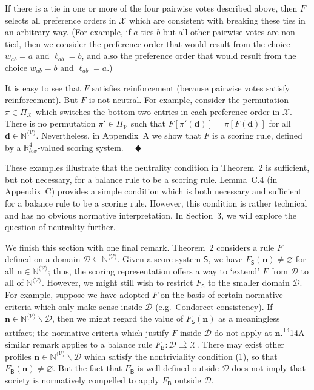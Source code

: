 \documentclass[
]{article}
\begin{document}
If there is a tie in one or more of the four pairwise votes described
above, then \(F\) selects all preference orders in \(\mathcal{X}\) which
are consistent with breaking these ties in an arbitrary way. (For
example, if \(a\) ties \(b\) but all other pairwise votes are non-tied,
then we consider the preference order that would result from the choice
\(w_{ab} = a\) and \(\ell_{ab} = b\), and also the preference order that
would result from the choice \(w_{ab} = b\) and \(\ell_{ab} = a\).)

It is easy to see that \(F\) satisfies reinforcement (because pairwise
votes satisfy reinforcement). But \(F\) is not neutral. For example,
consider the permutation \(\pi \in \Pi_{\mathcal{X}}\) which switches
the bottom two entries in each preference order in \(\mathcal{X}\).
There is no permutation \(\pi' \in \Pi_{\mathcal{V}}\) such that
\(F\left\lbrack \pi'\left( \mathbf{d} \right) \right\rbrack = \pi\left\lbrack F\left( \mathbf{d} \right) \right\rbrack\)
for all \(\mathbf{d} \in \mathbb{N}^{\langle\mathcal{V}\rangle}\).
Nevertheless, in Appendix~A we show that \(F\) is a scoring rule,
defined by a \(\mathbb{R}_{lex}^{4}\)-valued scoring system. \(\quad ♦\)

These examples illustrate that the neutrality condition in Theorem~2 is
sufficient, but not necessary, for a balance rule to be a scoring rule.
Lemma~C.4 (in Appendix~C) provides a simple condition which is both
necessary and sufficient for a balance rule to be a scoring rule.
However, this condition is rather technical and has no obvious normative
interpretation. In Section~3, we will explore the question of neutrality
further.

We finish this section with one final remark. Theorem~2 considers a rule
\(F\) defined on a domain
\(\mathcal{D} \subseteq \mathbb{N}^{\langle\mathcal{V}\rangle}\). Given
a score system \(\mathsf{S}\), we have
\(F_{\mathsf{S}}\left( \mathbf{n} \right) \neq \varnothing\)
for all \(\mathbf{n} \in \mathbb{N}^{\langle\mathcal{V}\rangle}\); thus,
the scoring representation offers a way to `extend' \(F\) from
\(\mathcal{D}\) to all of \(\mathbb{N}^{\langle\mathcal{V}\rangle}\).
However, we might still wish to restrict \(F_{\mathsf{S}}\) to the
smaller domain \(\mathcal{D}\). For example, suppose we have adopted
\(F\) on the basis of certain normative criteria which only make sense
inside \(\mathcal{D}\) (e.g.~Condorcet consistency). If
\(\mathbf{n} \in \mathbb{N}^{\langle\mathcal{V}\rangle} \smallsetminus \mathcal{D}\),
then we might regard the value of
\(F_{\mathsf{S}}\left( \mathbf{n} \right)\) as a meaningless artifact;
the normative criteria which justify \(F\) inside \(\mathcal{D}\) do not
apply at \(\mathbf{n}\).\textsuperscript{14}14A similar remark applies
to a balance rule
\(\left. F_{\mathsf{B}}:\mathcal{D}\rightrightarrows\mathcal{X} \right.\).
There may exist other profiles
\(\mathbf{n} \in \mathbb{N}^{\langle\mathcal{V}\rangle} \smallsetminus \mathcal{D}\)
which satisfy the nontriviality condition (1), so that
\(F_{\mathsf{B}}\left( \mathbf{n} \right) \neq \varnothing\).
But the fact that \(F_{\mathsf{B}}\) is well-defined outside
\(\mathcal{D}\) does not imply that society is normatively compelled to
apply \(F_{\mathsf{B}}\) outside \(\mathcal{D}\).
\end{document}
